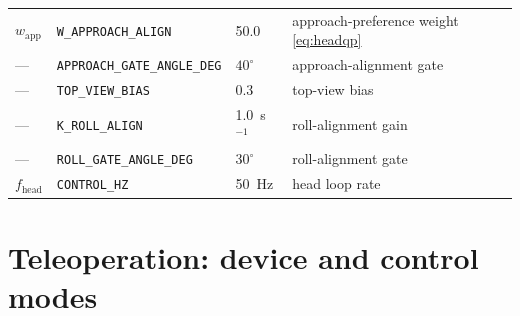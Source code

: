\begin{tabularx}{\linewidth}{@{}l>{\scriptsize}ll>{\raggedright\arraybackslash}X@{}}
$w_{\text{app}}$ & \texttt{W\_APPROACH\_ALIGN} & 50.0 & approach-preference weight \eqref{eq:headqp} \\
--- & \texttt{APPROACH\_GATE\_ANGLE\_DEG} & $40^{\circ}$ & approach-alignment gate \\
--- & \texttt{TOP\_VIEW\_BIAS} & 0.3 & top-view bias \\
--- & \texttt{K\_ROLL\_ALIGN} & 1.0~s$^{-1}$ & roll-alignment gain \\
--- & \texttt{ROLL\_GATE\_ANGLE\_DEG} & $30^{\circ}$ & roll-alignment gate \\
$f_{\text{head}}$ & \texttt{CONTROL\_HZ} & 50~Hz & head loop rate \\
\bottomrule
\end{tabularx}

\section{Teleoperation: device and control modes}
